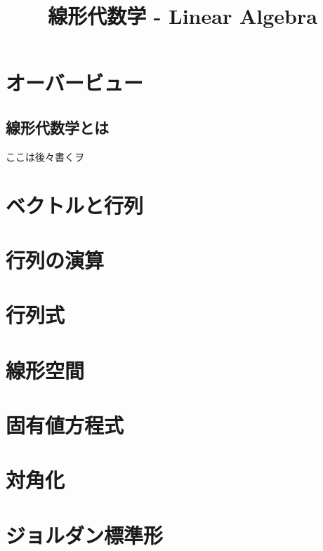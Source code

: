 \documentclass[a4paper]{jsreport}
\title{線形代数学 - Linear Algebra}
\begin{document}
    \maketitle

    \tableofcontents

    \chapter{オーバービュー}
        \section{線形代数学とは}
            ここは後々書くヲ
    

    \chapter{ベクトルと行列}


    \chapter{行列の演算}
    
    
    \chapter{行列式}
    
    
    \chapter{線形空間}
    
    
    \chapter{固有値方程式}
    

    \chapter{対角化}
    
    
    \chapter{ジョルダン標準形}
        
\end{document}
